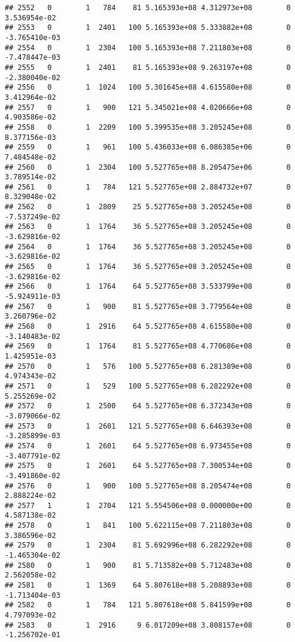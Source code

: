 \documentclass[
]{article}
\begin{document}
\begin{enumerate}
\begin{verbatim}
## 2552   0        1   784    81 5.165393e+08 4.312973e+08        0  3.536954e-02
## 2553   0        1  2401   100 5.165393e+08 5.333882e+08        0 -3.765410e-03
## 2554   0        1  2304   100 5.165393e+08 7.211803e+08        0 -7.478447e-03
## 2555   0        1  2401    81 5.165393e+08 9.263197e+08        0 -2.380040e-02
## 2556   0        1  1024   100 5.301645e+08 4.615580e+08        0  3.412964e-02
## 2557   0        1   900   121 5.345021e+08 4.020666e+08        0  4.903586e-02
## 2558   0        1  2209   100 5.399535e+08 3.205245e+08        0  8.377156e-03
## 2559   0        1   961   100 5.436033e+08 6.086385e+06        0  7.484548e-02
## 2560   0        1  2304   100 5.527765e+08 8.205475e+06        0  3.789514e-02
## 2561   0        1   784   121 5.527765e+08 2.884732e+07        0  8.329048e-02
## 2562   0        1  2809    25 5.527765e+08 3.205245e+08        0 -7.537249e-02
## 2563   0        1  1764    36 5.527765e+08 3.205245e+08        0 -3.629816e-02
## 2564   0        1  1764    36 5.527765e+08 3.205245e+08        0 -3.629816e-02
## 2565   0        1  1764    36 5.527765e+08 3.205245e+08        0 -3.629816e-02
## 2566   0        1  1764    64 5.527765e+08 3.533799e+08        0 -5.924911e-03
## 2567   0        1   900    81 5.527765e+08 3.779564e+08        0  3.260796e-02
## 2568   0        1  2916    64 5.527765e+08 4.615580e+08        0 -3.140483e-02
## 2569   0        1  1764    81 5.527765e+08 4.770686e+08        0  1.425951e-03
## 2570   0        1   576   100 5.527765e+08 6.281389e+08        0  4.974343e-02
## 2571   0        1   529   100 5.527765e+08 6.282292e+08        0  5.255269e-02
## 2572   0        1  2500    64 5.527765e+08 6.372343e+08        0 -3.079066e-02
## 2573   0        1  2601   121 5.527765e+08 6.646393e+08        0 -3.285899e-03
## 2574   0        1  2601    64 5.527765e+08 6.973455e+08        0 -3.407791e-02
## 2575   0        1  2601    64 5.527765e+08 7.300534e+08        0 -3.491860e-02
## 2576   0        1   900   100 5.527765e+08 8.205474e+08        0  2.888224e-02
## 2577   1        1  2704   121 5.554506e+08 0.000000e+00        0  4.587138e-02
## 2578   0        1   841   100 5.622115e+08 7.211803e+08        0  3.386596e-02
## 2579   0        1  2304    81 5.692996e+08 6.282292e+08        0 -1.465304e-02
## 2580   0        1   900    81 5.713582e+08 5.712483e+08        0  2.562058e-02
## 2581   0        1  1369    64 5.807618e+08 5.208893e+08        0 -1.713404e-03
## 2582   0        1   784   121 5.807618e+08 5.841599e+08        0  4.797093e-02
## 2583   0        1  2916     9 6.017209e+08 3.808157e+08        0 -1.256702e-01

\end{verbatim}
\end{enumerate}
\end{document}
